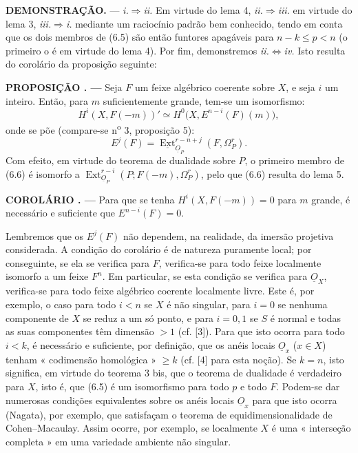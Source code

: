 \documentclass[11pt,twoside,openany]{book}
\numberwithin{equation}{section}
\newcommand{\src}[1]{%
  \phantomsection\hypertarget{src:#1}{}%
  \marginpar{\raggedleft\footnotesize\sffamily #1}%
}
\newcommand{\Osh}{\underline{O}}
\newcommand{\Extsh}{\underline{\operatorname{Ext}}}
\theoremstyle{plain}
\theoremstyle{definition}
\theoremstyle{remark}
\newcommand{\result}[2]{%
  \par\medskip\noindent\textbf{#1%
  \if\relax\detokenize{#2}\relax\else\space#2\fi. ---}\enspace
}
\newcommand{\FgaUnitKey}{frontmatter}
\renewcommand{\src}[1]{%
  \phantomsection\hypertarget{src:\FgaUnitKey:#1}{}%
  \marginpar{\raggedleft\footnotesize\sffamily #1}%
}
\begin{document}
\noindent\textbf{DEMONSTRAÇÃO.} --- \textit{i.}$\Rightarrow$\textit{ii.} Em
virtude do lema 4, \textit{ii.}$\Rightarrow$\textit{iii.} em virtude do lema 3,
\textit{iii.}$\Rightarrow$\textit{i.} mediante um raciocínio padrão bem conhecido,
tendo em conta que os dois membros de (6.5) são então funtores apagáveis
para $n-k\leq p<n$ (o primeiro o é em virtude do lema 4). Por fim, demonstremos
\textit{ii.}$\Leftrightarrow$\textit{iv.} Isto resulta do corolário da
proposição seguinte:

\result{PROPOSIÇÃO}{6} Seja $F$ um feixe algébrico coerente sobre $X$, e
seja $i$ um inteiro. Então, para $m$ suficientemente grande, tem-se um isomorfismo:
\begin{equation}\tag{6.6}
  H^{i}(X,F(-m))'
  \simeq H^{0}\bigl(X,E^{n-i}(F)(m)\bigr),
\end{equation}
onde se põe (compare-se n\textsuperscript{o} 3, proposição 5):
\begin{equation}\tag{6.7}
  E^{j}(F)=\Extsh_{\Osh_P}^{r-n+j}(F,\Omega_P^{r}).
\end{equation}
Com efeito, em virtude do teorema de dualidade sobre $P$, o primeiro membro de (6.6)
é isomorfo a
$\operatorname{Ext}_{\Osh_P}^{r-i}(P;F(-m),\Omega_P^{r})$, pelo que (6.6) resulta
do lema 5.

\src{187}
\result{COROLÁRIO}{} Para que se tenha $H^{i}(X,F(-m))=0$ para $m$ grande, é
necessário e suficiente que $E^{n-i}(F)=0$.

Lembremos que os $E^{j}(F)$ não dependem, na realidade, da imersão projetiva
considerada. A condição do corolário é de natureza puramente local; por conseguinte,
se ela se verifica para $F$, verifica-se para todo feixe localmente
isomorfo a um feixe $F^{n}$. Em particular, se esta condição se verifica
para $\Osh_X$, verifica-se para todo feixe algébrico coerente localmente
livre. Este é, por exemplo, o caso para todo $i<n$ se $X$ é não singular, para
$i=0$ se nenhuma componente de $X$ se reduz a um só ponto, e para $i=0,1$
se $S$ é normal e todas as suas componentes têm dimensão $>1$ (cf.
[3]). Para que isto ocorra para todo
$i<k$, é necessário e suficiente, por definição, que os anéis locais
$\Osh_x$ ($x\in X$) tenham « codimensão homológica » $\geq k$ (cf. [4]
para esta noção). Se $k=n$, isto significa, em virtude do teorema 3 bis, que o
teorema de dualidade é verdadeiro para $X$, isto é, que (6.5) é um isomorfismo para
todo $p$ e todo $F$. Podem-se dar numerosas condições equivalentes sobre
os anéis locais $\Osh_x$ para que isto ocorra (Nagata), por exemplo, que
satisfaçam o teorema de equidimensionalidade de Cohen--Macaulay. Assim ocorre,
por exemplo, se localmente $X$ é uma « interseção completa » em uma
variedade ambiente não singular.
\end{document}
